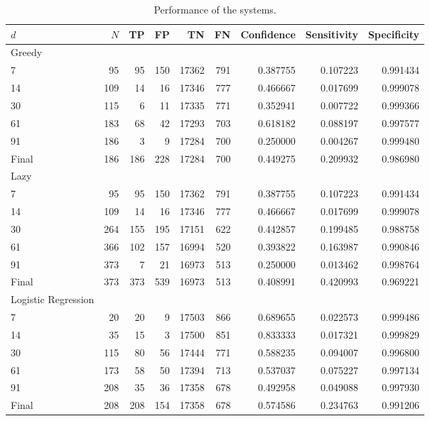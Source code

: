\begin{table}[h]
	\centering

	\begin{tabular}{lrrrrrrrr}
	\toprule
	{$d$} &    $N$ &   TP &   FP &     TN &   FN &  Confidence &  Sensitivity &  Specificity \\
	\midrule
	\toprule
	Greedy & & & & & & & & \\
	\midrule
	7     &   95 &   95 &  150 &  17362 &  791 &    0.387755 &     0.107223 &     0.991434 \\
	14    &  109 &   14 &   16 &  17346 &  777 &    0.466667 &     0.017699 &     0.999078 \\
	30    &  115 &    6 &   11 &  17335 &  771 &    0.352941 &     0.007722 &     0.999366 \\
	61    &  183 &   68 &   42 &  17293 &  703 &    0.618182 &     0.088197 &     0.997577 \\
	91    &  186 &    3 &    9 &  17284 &  700 &    0.250000 &     0.004267 &     0.999480 \\
	Final &  186 &  186 &  228 &  17284 &  700 &    0.449275 &     0.209932 &     0.986980 \\
	\bottomrule
	\toprule
	Lazy & & & & & & & & \\
	\midrule
	7     &   95 &   95 &  150 &  17362 &  791 &    0.387755 &     0.107223 &     0.991434 \\
	14    &  109 &   14 &   16 &  17346 &  777 &    0.466667 &     0.017699 &     0.999078 \\
	30    &  264 &  155 &  195 &  17151 &  622 &    0.442857 &     0.199485 &     0.988758 \\
	61    &  366 &  102 &  157 &  16994 &  520 &    0.393822 &     0.163987 &     0.990846 \\
	91    &  373 &    7 &   21 &  16973 &  513 &    0.250000 &     0.013462 &     0.998764 \\
	Final &  373 &  373 &  539 &  16973 &  513 &    0.408991 &     0.420993 &     0.969221 \\
	\bottomrule
	\toprule
	Logistic Regression & & & & & & & & \\
	\midrule
	7     &   20 &   20 &    9 &  17503 &  866 &    0.689655 &     0.022573 &     0.999486 \\
	14    &   35 &   15 &    3 &  17500 &  851 &    0.833333 &     0.017321 &     0.999829 \\
	30    &  115 &   80 &   56 &  17444 &  771 &    0.588235 &     0.094007 &     0.996800 \\
	61    &  173 &   58 &   50 &  17394 &  713 &    0.537037 &     0.075227 &     0.997134 \\
	91    &  208 &   35 &   36 &  17358 &  678 &    0.492958 &     0.049088 &     0.997930 \\
	Final &  208 &  208 &  154 &  17358 &  678 &    0.574586 &     0.234763 &     0.991206 \\
	\bottomrule
	\end{tabular}

	\caption{Performance of the \Abb systems.}
	\label{tbl:results:abb}
\end{table}


